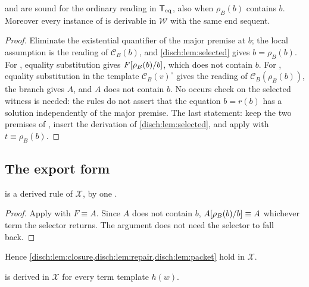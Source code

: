\begin{proposition}[Soundness]
\label{disch:prop:inferred-sound}
 and  are sound for the ordinary reading in
$\mathsf{T}_{\mathrm{eq}}$, also when $\rho_B(b)$ contains $b$. Moreover every instance of
 is derivable in $\mathcal W$ with the same end sequent.
\end{proposition}

\begin{proof}
Eliminate the existential quantifier of the major premise at $b$; the
local assumption is the reading of $\mathcal C_B(b)$, and
\cref{disch:lem:selected} gives $b=\rho_B(b)$. For ,
equality substitution gives $F[\rho_B(b)/b]$, which does not contain
$b$. For , equality substitution in the template
$\mathcal C_B(v)^\circ$ gives the reading of $\mathcal C_B(\rho_B(b))$, the
branch gives $A$, and $A$ does not contain $b$. No occurs check on the
selected witness is needed: the rules do not assert that the equation
$b=r(b)$ has a solution independently of the major premise. The last
statement: keep the two premises of , insert the
derivation of \cref{disch:lem:selected}, and apply  with
$t\equiv\rho_B(b)$.
\end{proof}

\subsection{The export form}

\begin{lemma}
\label{disch:lem:export-elim}
 is a derived rule of $\mathcal X$, by one
.
\end{lemma}

\begin{proof}
Apply  with $F\equiv A$. Since $A$ does not contain $b$,
$A[\rho_B(b)/b]\equiv A$ whichever term the selector returns. The
argument does not need the selector to fall back.
\end{proof}

Hence \cref{disch:lem:closure,disch:lem:repair,disch:lem:packet} hold in
$\mathcal X$.

\begin{theorem}
\label{disch:thm:export-transport}
 is derived in $\mathcal X$ for every term template $h(w)$.
\end{theorem}

